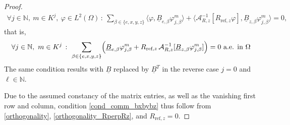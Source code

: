 \documentclass[10pt,a4paper]{amsart}
\newcommand\calA{\mathcal{A}}
\newcommand\ulB{\underline{B}}
\begin{document}
\begin{proof}
\[\begin{aligned}
\forall j\in \mathbb{N}, \ m\in K^j, \ \varphi\in L^2(\Omega) \,:\
\sum_{\beta\in\{e,x,y,z\}}
\langle \varphi,\ulB_{e,\beta} \varphi_{j,\beta}^m \rangle
+\langle \calA_{R,z}^{-1}[R_{\text{ref},z}\varphi],\ulB_{z,\beta} \varphi_{j,\beta}^m \rangle
=0,
\end{aligned}
\]
that is,
\begin{equation}\label{commcond_ell0}
\begin{aligned}
\forall j\in \mathbb{N}, \ m\in K^j \,:\
\sum_{\beta\in\{e,x,y,z\}}\Bigl(\ulB_{e,\beta} \varphi_{j,\beta}^m
+R_{\text{ref},z}\, \calA_{R,z}^{-1}[\ulB_{z,\beta} \varphi_{j,\beta}^m]\Bigr)
=0 \text{ a.e. in }\Omega
\end{aligned}
\end{equation}
The same condition results with $\ulB$ replaced by $\ulB^T$ in the reverse case $j=0$ and $\ell\in\mathbb{N}$.

Due to the assumed constancy of the matrix entries, as well as the vanishing first row and column, condition \eqref{cond_comm_bxbybz} thus follow from \eqref{orthogonality}, \eqref{orthogonality_RperpRz}, and $R_{\text{ref},z}=0$.
\end{proof}
\end{document}

